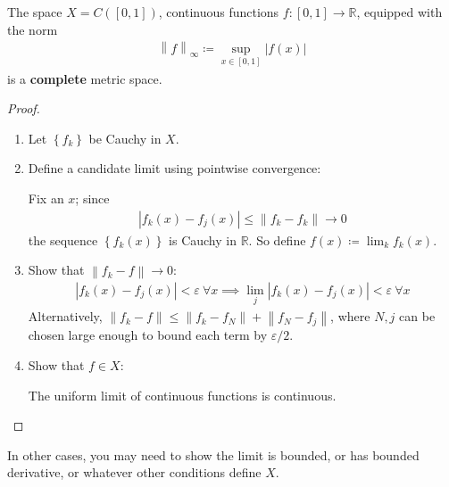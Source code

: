 \begin{proposition}[$C(I)$ is complete]

The space \(X = C([0, 1])\), continuous functions
\(f: [0, 1] \to {\mathbb{R}}\), equipped with the norm
\begin{align*}
{\left\lVert {f} \right\rVert}_\infty \coloneqq\sup_{x\in [0, 1]} {\left\lvert {f(x)} \right\rvert}
\end{align*}
is a \textbf{complete} metric space.

\end{proposition}

\begin{proof}

\envlist

\begin{enumerate}
\def\labelenumi{\arabic{enumi}.}
\item
  Let \(\left\{{f_k}\right\}\) be Cauchy in \(X\).
\item
  Define a candidate limit using pointwise convergence:

  Fix an \(x\); since
  \begin{align*}
    {\left\lvert {f_k(x) - f_j(x)} \right\rvert}  \leq {\left\lVert {f_k - f_k} \right\rVert} \to 0
    \end{align*}
  the sequence \(\left\{{f_k(x)}\right\}\) is Cauchy in
  \({\mathbb{R}}\). So define \(f(x) \coloneqq\lim_k f_k(x)\).
\item
  Show that \({\left\lVert {f_k - f} \right\rVert} \to 0\):
  \begin{align*}
    {\left\lvert {f_k(x) - f_j(x)} \right\rvert} < \varepsilon ~\forall x \implies \lim_{j} {\left\lvert {f_k(x) - f_j(x)} \right\rvert} <\varepsilon ~\forall x
    \end{align*}
  Alternatively,
  \({\left\lVert {f_k-f} \right\rVert} \leq {\left\lVert {f_k - f_N} \right\rVert} + {\left\lVert {f_N - f_j} \right\rVert}\),
  where \(N, j\) can be chosen large enough to bound each term by
  \(\varepsilon/2\).
\item
  Show that \(f\in X\):

  The uniform limit of continuous functions is continuous.
\end{enumerate}

\end{proof}

\begin{remark}

In other cases, you may need to show the limit is bounded, or has
bounded derivative, or whatever other conditions define \(X\).

\end{remark}

